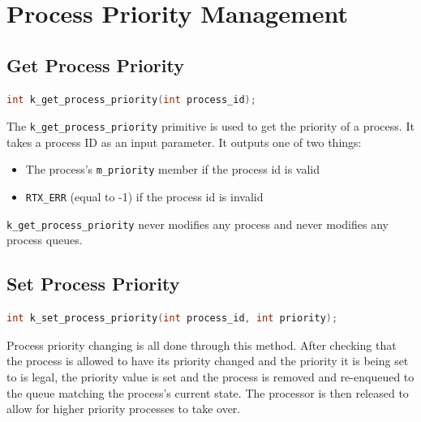 \documentclass[12pt]{report}
\begin{document}

\section{Process Priority Management}

\subsection{Get Process Priority}

\begin{minipage}{\textwidth}
\begin{lstlisting}[language=C, frame=single]
int k_get_process_priority(int process_id);
\end{lstlisting}
\end{minipage}

The {\tt k\_get\_process\_priority} primitive is used to get the priority of a process. It takes a process ID as an input parameter. It outputs one of two things:\\

\begin{itemize}
\item The process's {\tt m\_priority} member if the process id is valid
\item {\tt RTX\_ERR} (equal to -1) if the process id is invalid
\end{itemize}

{\tt k\_get\_process\_priority} never modifies any process and never modifies any process queues.\\

\subsection{Set Process Priority}

\begin{minipage}{\textwidth}
\begin{lstlisting}[language=C, frame=single]
int k_set_process_priority(int process_id, int priority);
\end{lstlisting}
\end{minipage}

Process priority changing is all done through this method. After checking that the process is allowed to have its priority changed and the priority it is being set to is legal, the priority value is set and the process is removed and re-enqueued to the queue matching the process's current state. The processor is then released to allow for higher priority processes to take over.
\end{document}

